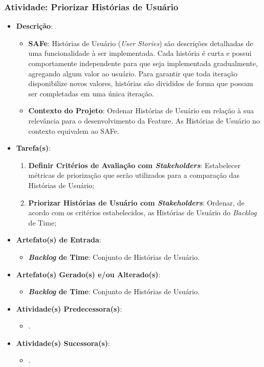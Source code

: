 			\subsubsection[Atividade: Priorizar Histórias de Usuário]{Atividade: Priorizar Histórias de Usuário}
			\label{subsubsec:processo_atividade_time_priorizar_us}
				\begin{itemize}
					\item{\textbf{Descrição}:
						\begin{itemize}
							\item{\textbf{SAFe}: Histórias de Usuário (\emph{User Stories}) são descrições detalhadas de uma funcionalidade à ser implementada. Cada história é curta e possui comportamente independente para que seja implementada gradualmente, agregando algum valor ao usuário. Para garantir que toda iteração disponibilize novos valores, histórias são divididos de forma que possam ser completadas em uma única iteração.}
							\item{\textbf{Contexto do Projeto}: Ordenar Histórias de Usuário em relação à sua relevância para o desenvolvimento da Feature. As Histórias de Usuário no contexto equivalem ao SAFe.}
						\end{itemize}}
					\item{\textbf{Tarefa(s)}:
						\begin{enumerate}
							\item{\textbf{Definir Critérios de Avaliação com \emph{Stakeholders}}: Estabelecer métricas de priorização que serão utilizados para a comparação das Histórias de Usuário;}
							\item{\textbf{Priorizar Histórias de Usuário com \emph{Stakeholders}}: Ordenar, de acordo com os critérios estabelecidos, as Histórias de Usuário do \emph{Backlog} de Time;}
						\end{enumerate}}
					\item{\textbf{Artefato(s) de Entrada}:
						\begin{itemize}
							\item{\textbf{\emph{Backlog} de Time}: Conjunto de Histórias de Usuário.}
						\end{itemize}}
					\item{\textbf{Artefato(s) Gerado(s) e/ou Alterado(s)}:
						\begin{itemize}
							\item{\textbf{\emph{Backlog} de Time}: Conjunto de Histórias de Usuário.}
						\end{itemize}}
					\item{\textbf{Atividade(s) Predecessora(s)}:
						\begin{itemize}
							\item{.}
						\end{itemize}}
					\item{\textbf{Atividade(s) Sucessora(s)}:
						\begin{itemize}
							\item{.}
						\end{itemize}}
				\end{itemize}

